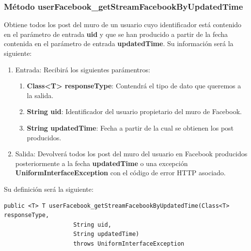\subsubsection{Método userFacebook\_getStreamFacebookByUpdatedTime}
Obtiene todos los post del muro de un usuario cuyo identificador está contenido en el parámetro de entrada \textbf{uid} y que se han producido a partir de la fecha contenida en el parámetro de entrada \textbf{updatedTime}. Su información será la siguiente:
\begin{enumerate}
\item Entrada: Recibirá los siguientes parámentros:
\begin{enumerate}
\item \textbf{Class<T> responseType}: Contendrá el tipo de dato que queremos a la salida.
\item \textbf{String uid}: Identificador del usuario propietario del muro de Facebook.
\item \textbf{String updatedTime}: Fecha a partir de la cual se obtienen los post producidos.
\end{enumerate}
\item Salida: Devolverá todos los post del muro del usuario en Facebook producidos posteriormente a la fecha \textbf{updatedTime} o una excepción \textbf{UniformInterfaceException} con el código de error HTTP asociado.
\end{enumerate}
\bigskip
\par
Su definición será la siguiente:
\begin{verbatim}public <T> T userFacebook_getStreamFacebookByUpdatedTime(Class<T> responseType, 
					String uid, 
					String updatedTime) 
					throws UniformInterfaceException \end{verbatim}



